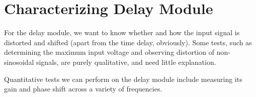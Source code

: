 \documentclass{article}
\begin{document}
    \section{Characterizing Delay Module}

    For the delay module, we want to know whether and how the input signal is distorted and shifted (apart from the time delay, obviously). Some tests, such as determining the maximum input voltage and observing distortion of non-sinosoidal signals, are purely qualitative, and need little explanation.

    Quantitative tests we can perform on the delay module include measuring its gain and phase shift across a variety of frequencies.
\end{document}
